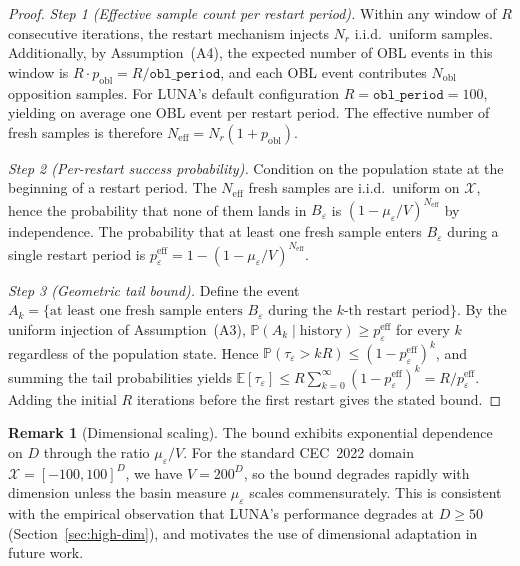 \documentclass[review]{elsarticle}
\theoremstyle{definition}
\newtheorem{remark}{Remark}
\begin{document}
\begin{proof}
\textit{Step 1 (Effective sample count per restart period).} Within any window of $R$ consecutive iterations, the restart mechanism injects $N_r$ i.i.d.\ uniform samples. Additionally, by Assumption~(A4), the expected number of OBL events in this window is $R\cdot p_{\mathrm{obl}}=R/\texttt{obl\_period}$, and each OBL event contributes $N_{\mathrm{obl}}$ opposition samples. For LUNA's default configuration $R=\texttt{obl\_period}=100$, yielding on average one OBL event per restart period. The effective number of fresh samples is therefore $N_{\mathrm{eff}}=N_r(1+p_{\mathrm{obl}})$.

\textit{Step 2 (Per-restart success probability).} Condition on the population state at the beginning of a restart period. The $N_{\mathrm{eff}}$ fresh samples are i.i.d.\ uniform on $\mathcal{X}$, hence the probability that none of them lands in $B_\varepsilon$ is $(1-\mu_\varepsilon/V)^{N_{\mathrm{eff}}}$ by independence. The probability that at least one fresh sample enters $B_\varepsilon$ during a single restart period is $p_\varepsilon^{\mathrm{eff}}=1-(1-\mu_\varepsilon/V)^{N_{\mathrm{eff}}}$.

\textit{Step 3 (Geometric tail bound).} Define the event $A_k=\{\text{at least one fresh sample enters }B_\varepsilon\text{ during the }k\text{-th restart period}\}$. By the uniform injection of Assumption~(A3), $\mathbb{P}(A_k\mid\text{history})\ge p_\varepsilon^{\mathrm{eff}}$ for every $k$ regardless of the population state. Hence $\mathbb{P}(\tau_\varepsilon>kR)\le(1-p_\varepsilon^{\mathrm{eff}})^k$, and summing the tail probabilities yields $\mathbb{E}[\tau_\varepsilon]\le R\sum_{k=0}^\infty(1-p_\varepsilon^{\mathrm{eff}})^k=R/p_\varepsilon^{\mathrm{eff}}$. Adding the initial $R$ iterations before the first restart gives the stated bound.
\end{proof}

\begin{remark}[Dimensional scaling]
The bound exhibits exponential dependence on $D$ through the ratio $\mu_\varepsilon/V$. For the standard CEC~2022 domain $\mathcal{X}=[-100,100]^D$, we have $V=200^D$, so the bound degrades rapidly with dimension unless the basin measure $\mu_\varepsilon$ scales commensurately. This is consistent with the empirical observation that LUNA's performance degrades at $D\ge 50$ (Section~\ref{sec:high-dim}), and motivates the use of dimensional adaptation in future work.
\end{remark}
\end{document}
